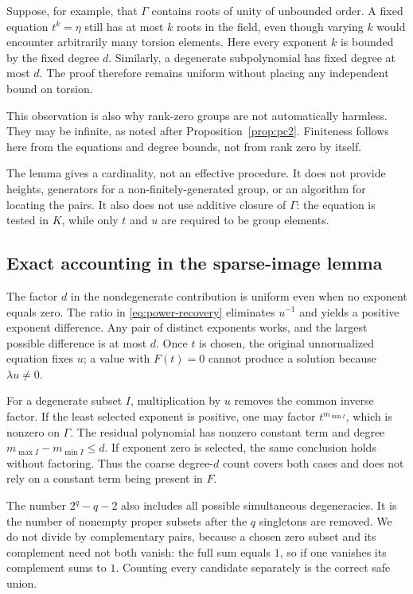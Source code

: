 \documentclass[11pt]{article}
\theoremstyle{definition}
\begin{document}
Suppose, for example, that \(\Gamma\) contains roots of unity of unbounded order. A fixed equation \(t^k=\eta\) still has at most \(k\) roots in the field, even though varying \(k\) would encounter arbitrarily many torsion elements. Here every exponent \(k\) is bounded by the fixed degree \(d\). Similarly, a degenerate subpolynomial has fixed degree at most \(d\). The proof therefore remains uniform without placing any independent bound on torsion.

This observation is also why rank-zero groups are not automatically harmless. They may be infinite, as noted after Proposition~\ref{prop:pc2}. Finiteness follows here from the equations and degree bounds, not from rank zero by itself.

The lemma gives a cardinality, not an effective procedure. It does not provide heights, generators for a non-finitely-generated group, or an algorithm for locating the pairs. It also does not use additive closure of \(\Gamma\): the equation is tested in \(K\), while only \(t\) and \(u\) are required to be group elements.


\subsection{Exact accounting in the sparse-image lemma}

The factor \(d\) in the nondegenerate contribution is uniform even when no exponent equals zero. The ratio in \eqref{eq:power-recovery} eliminates \(u^{-1}\) and yields a positive exponent difference. Any pair of distinct exponents works, and the largest possible difference is at most \(d\). Once \(t\) is chosen, the original unnormalized equation fixes \(u\); a value with \(F(t)=0\) cannot produce a solution because \(\lambda u\neq0\).

For a degenerate subset \(I\), multiplication by \(u\) removes the common inverse factor. If the least selected exponent is positive, one may factor \(t^{m_{\min I}}\), which is nonzero on \(\Gamma\). The residual polynomial has nonzero constant term and degree \(m_{\max I}-m_{\min I}\leq d\). If exponent zero is selected, the same conclusion holds without factoring. Thus the coarse degree-\(d\) count covers both cases and does not rely on a constant term being present in \(F\).

The number \(2^q-q-2\) also includes all possible simultaneous degeneracies. It is the number of nonempty proper subsets after the \(q\) singletons are removed. We do not divide by complementary pairs, because a chosen zero subset and its complement need not both vanish: the full sum equals \(1\), so if one vanishes its complement sums to \(1\). Counting every candidate separately is the correct safe union.
\end{document}
